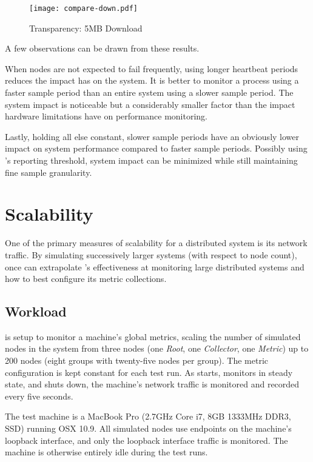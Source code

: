 \begin{figure}[H]
    \centering
    \vspace{-20pt}
    \texttt{[image: compare-down.pdf]}
    \vspace{-50pt}
    \caption{Transparency: 5MB Download}
    \label{fig:down5mb_graph}
\end{figure}

A few observations can be drawn from these results.

When nodes are not expected to fail frequently, using longer heartbeat periods reduces the impact \dcamp has on the
system. It is better to monitor a process using a faster sample period than an entire system using a slower sample
period. The \dcamp system impact is noticeable but a considerably smaller factor than the impact hardware limitations
have on performance monitoring.

Lastly, holding all else constant, slower sample periods have an obviously lower impact on system performance compared
to faster sample periods. Possibly using \dcampns's reporting threshold, system impact can be minimized while still
maintaining fine sample granularity.

\section{Scalability}

One of the primary measures of scalability for a distributed system is its network traffic.\cite{zanikolas2005} By
simulating successively larger \dcamp systems (with respect to node count), once can extrapolate \dcampns's effectiveness
at monitoring large distributed systems and how to best configure its metric collections.

\subsection{Workload}

\dcamp is setup to monitor a machine's global metrics, scaling the number of simulated nodes in the \dcamp system from
three nodes (one \textit{Root}, one \textit{Collector}, one \textit{Metric}) up to 200 nodes (eight groups with
twenty-five nodes per group). The metric configuration is kept constant for each test run. As \dcamp starts, monitors in
steady state, and shuts down, the machine's network traffic is monitored and recorded every five seconds.

The test machine is a MacBook Pro (2.7GHz Core i7, 8GB 1333MHz DDR3, SSD) running OSX 10.9. All simulated \dcamp nodes
use endpoints on the machine's loopback interface, and only the loopback interface traffic is monitored. The machine is
otherwise entirely idle during the test runs.

